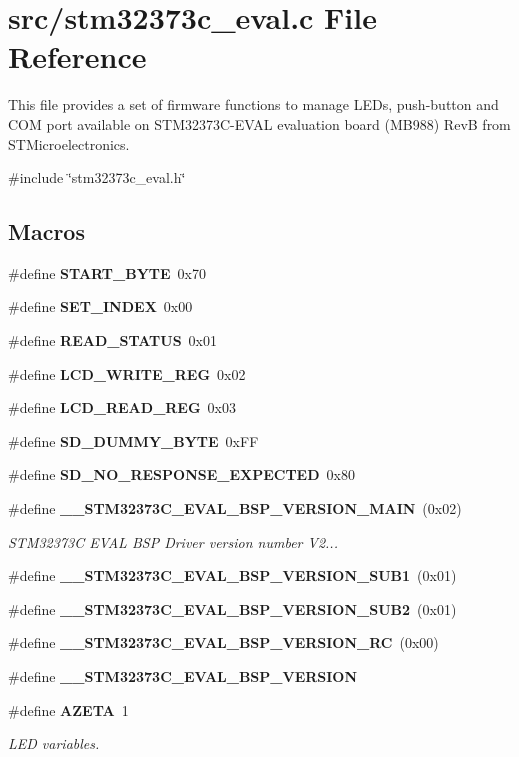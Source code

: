 \section{src/stm32373c\+\_\+eval.c File Reference}
\label{stm32373c__eval_8c}


This file provides a set of firmware functions to manage L\+E\+Ds, push-\/button and C\+OM port available on S\+T\+M32373\+C-\/\+E\+V\+AL evaluation board (M\+B988) RevB from S\+T\+Microelectronics.  


{\ttfamily \#include \char`\"{}stm32373c\+\_\+eval.\+h\char`\"{}}\newline
\subsection*{Macros}
\begin{DoxyCompactItemize}
\item 
\#define \textbf{ S\+T\+A\+R\+T\+\_\+\+B\+Y\+TE}~0x70
\item 
\#define \textbf{ S\+E\+T\+\_\+\+I\+N\+D\+EX}~0x00
\item 
\#define \textbf{ R\+E\+A\+D\+\_\+\+S\+T\+A\+T\+US}~0x01
\item 
\#define \textbf{ L\+C\+D\+\_\+\+W\+R\+I\+T\+E\+\_\+\+R\+EG}~0x02
\item 
\#define \textbf{ L\+C\+D\+\_\+\+R\+E\+A\+D\+\_\+\+R\+EG}~0x03
\item 
\#define \textbf{ S\+D\+\_\+\+D\+U\+M\+M\+Y\+\_\+\+B\+Y\+TE}~0x\+FF
\item 
\#define \textbf{ S\+D\+\_\+\+N\+O\+\_\+\+R\+E\+S\+P\+O\+N\+S\+E\+\_\+\+E\+X\+P\+E\+C\+T\+ED}~0x80
\item 
\#define \textbf{ \+\_\+\+\_\+\+S\+T\+M32373\+C\+\_\+\+E\+V\+A\+L\+\_\+\+B\+S\+P\+\_\+\+V\+E\+R\+S\+I\+O\+N\+\_\+\+M\+A\+IN}~(0x02)
\begin{DoxyCompactList}\small\item\em S\+T\+M32373C E\+V\+AL B\+SP Driver version number V2... \end{DoxyCompactList}\item 
\#define \textbf{ \+\_\+\+\_\+\+S\+T\+M32373\+C\+\_\+\+E\+V\+A\+L\+\_\+\+B\+S\+P\+\_\+\+V\+E\+R\+S\+I\+O\+N\+\_\+\+S\+U\+B1}~(0x01)
\item 
\#define \textbf{ \+\_\+\+\_\+\+S\+T\+M32373\+C\+\_\+\+E\+V\+A\+L\+\_\+\+B\+S\+P\+\_\+\+V\+E\+R\+S\+I\+O\+N\+\_\+\+S\+U\+B2}~(0x01)
\item 
\#define \textbf{ \+\_\+\+\_\+\+S\+T\+M32373\+C\+\_\+\+E\+V\+A\+L\+\_\+\+B\+S\+P\+\_\+\+V\+E\+R\+S\+I\+O\+N\+\_\+\+RC}~(0x00)
\item 
\#define \textbf{ \+\_\+\+\_\+\+S\+T\+M32373\+C\+\_\+\+E\+V\+A\+L\+\_\+\+B\+S\+P\+\_\+\+V\+E\+R\+S\+I\+ON}
\item 
\#define \textbf{ A\+Z\+E\+TA}~1
\begin{DoxyCompactList}\small\item\em L\+ED variables. \end{DoxyCompactList}\end{DoxyCompactItemize}
